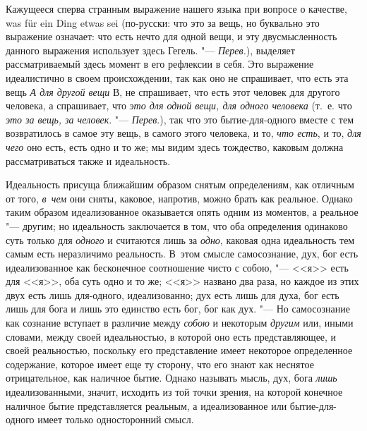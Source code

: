 Кажущееся сперва странным выражение нашего языка при вопросе о качестве, was
für ein Ding etwas sei (по-русски: что это за вещь, но буквально это
выражение означает: что есть нечто для одной вещи, и эту двусмысленность
данного выражения использует здесь Гегель. "--- {\em Перев.}), выделяет
рассматриваемый здесь момент в его рефлексии в себя. Это выражение
идеалистично в своем происхождении, так как оно не спрашивает, что есть эта
вещь {\em А для другой вещи} В, не спрашивает, что есть
этот человек для другого человека, а спрашивает, что
{\em это для одной вещи, для одного человека} (т.~е.
что {\em это за вещь, за человек}. "--- {\em Перев}.),
так что это бытие-для-одного вместе с тем
возвратилось в самое эту вещь, в самого этого человека, и то,
{\em что есть}, и то, {\em для чего} оно есть,
есть одно и то же; мы видим здесь тождество, каковым должна
рассматриваться также и идеальность.

Идеальность присуща ближайшим образом снятым определениям, как отличным от
того, {\em в~чем} они сняты, каковое, напротив, можно
брать как реальное. Однако таким образом идеализованное оказывается опять
одним из моментов, а реальное "--- другим; но идеальность заключается в том,
что оба определения одинаково суть только для
{\em одного} и считаются лишь за
{\em одно}, каковая одна идеальность тем самым есть
неразличимо реальность. В~этом смысле самосознание, дух, бог есть
идеализованное как бесконечное соотношение чисто с собою, "--- <<я>> есть для
<<я>>, оба суть одно и то же; <<я>> названо два раза, но каждое из этих двух
есть лишь для-одного, идеализованно; дух есть лишь для духа, бог есть лишь
для бога и лишь это единство есть бог, бог как дух. "--- Но самосознание как
сознание вступает в различие между {\em собою} и
некоторым {\em другим} или, иными словами, между своей
идеальностью, в которой оно есть представляющее, и своей реальностью,
поскольку его представление имеет некоторое определенное содержание,
которое имеет еще ту сторону, что его знают как неснятое отрицательное,
как наличное бытие. Однако называть мысль, дух, бога
{\em лишь} идеализованными, значит, исходить из той
точки зрения, на которой конечное наличное бытие представляется реальным, а
идеализованное или бытие-для-одного имеет только односторонний смысл.


